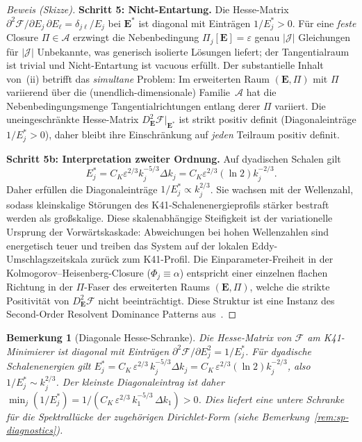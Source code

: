 \documentclass[12pt,a4paper]{article}
\theoremstyle{breakdef}
\theoremstyle{breakplain}
\theoremstyle{breakdef}
\newtheorem{remark}[definition]{Bemerkung}
\begin{document}
\begin{proof}[Beweis (Skizze)]
\textbf{Schritt 5: Nicht-Entartung.}\quad
Die Hesse-Matrix $\partial^2 \mathcal{F}/\partial E_j\,\partial E_\ell
= \delta_{j\ell}/E_j$ bei $\mathbf{E}^*$ ist diagonal mit Einträgen
$1/E_j^* > 0$. Für eine \emph{feste} Closure $\Pi \in \mathscr{A}$
erzwingt die Nebenbedingung $\Pi_j[\mathbf{E}] = \varepsilon$ genau
$|\mathcal{J}|$ Gleichungen für $|\mathcal{J}|$ Unbekannte, was
generisch isolierte Lösungen liefert; der Tangentialraum ist trivial
und Nicht-Entartung ist vacuous erfüllt. Der substantielle Inhalt
von~(ii) betrifft das \emph{simultane} Problem: Im erweiterten Raum
$(\mathbf{E}, \Pi)$ mit $\Pi$ variierend über die
(unendlich-dimensionale) Familie~$\mathscr{A}$ hat die
Nebenbedingungsmenge Tangentialrichtungen entlang derer $\Pi$ variiert.
Die uneingeschränkte Hesse-Matrix
$D^2_{\mathbf{E}}\mathcal{F}|_{\mathbf{E}^*}$ ist strikt positiv
definit (Diagonaleinträge $1/E_j^* > 0$), daher bleibt ihre
Einschränkung auf \emph{jeden} Teilraum positiv definit.

\medskip
\noindent\textbf{Schritt 5b: Interpretation zweiter Ordnung.}\quad
Auf dyadischen Schalen gilt
\[
  E_j^*
  = C_K\varepsilon^{2/3}k_j^{-5/3}\Delta k_j
  = C_K\varepsilon^{2/3}(\ln2)k_j^{-2/3}.
\]
Daher erfüllen die Diagonaleinträge $1/E_j^* \propto k_j^{2/3}$. Sie wachsen mit
der Wellenzahl, sodass kleinskalige Störungen des K41-Schalenenergieprofils
stärker bestraft werden als großskalige. Diese skalenabhängige Steifigkeit ist
der variationelle Ursprung der Vorwärtskaskade: Abweichungen bei hohen
Wellenzahlen sind energetisch teuer und treiben das System auf der lokalen
Eddy-Umschlagszeitskala zurück zum K41-Profil. Die Einparameter-Freiheit
in der Kolmogorov--Heisenberg-Closure ($\Phi_j \equiv \alpha$) entspricht
einer einzelnen flachen Richtung in der $\Pi$-Faser des erweiterten Raums
$(\mathbf{E}, \Pi)$, welche die strikte Positivität von
$D^2_{\mathbf{E}}\mathcal{F}$ nicht beeinträchtigt. Diese Struktur ist
eine Instanz des Second-Order Resolvent Dominance Patterns
aus~\cite{FST-Unified2026}.
\end{proof}

\begin{remark}[Diagonale Hesse-Schranke]\label{rem:hessian}
Die Hesse-Matrix von $\mathcal{F}$ am K41-Minimierer ist diagonal mit Einträgen $\partial^2\mathcal{F}/\partial E_j^2 = 1/E_j^*$. Für dyadische Schalenenergien gilt
$E_j^* = C_K\,\varepsilon^{2/3}\,k_j^{-5/3}\Delta k_j
= C_K\,\varepsilon^{2/3}(\ln2)k_j^{-2/3}$, also
$1/E_j^*\sim k_j^{2/3}$. Der kleinste Diagonaleintrag ist daher
$\min_j(1/E_j^*) = 1/(C_K\,\varepsilon^{2/3}\,k_1^{-5/3}\,\Delta k_1) > 0$.
Dies liefert eine untere Schranke für die Spektrallücke der zugehörigen
Dirichlet-Form (siehe Bemerkung~\ref{rem:sp-diagnostics}).
\end{remark}
\end{document}
